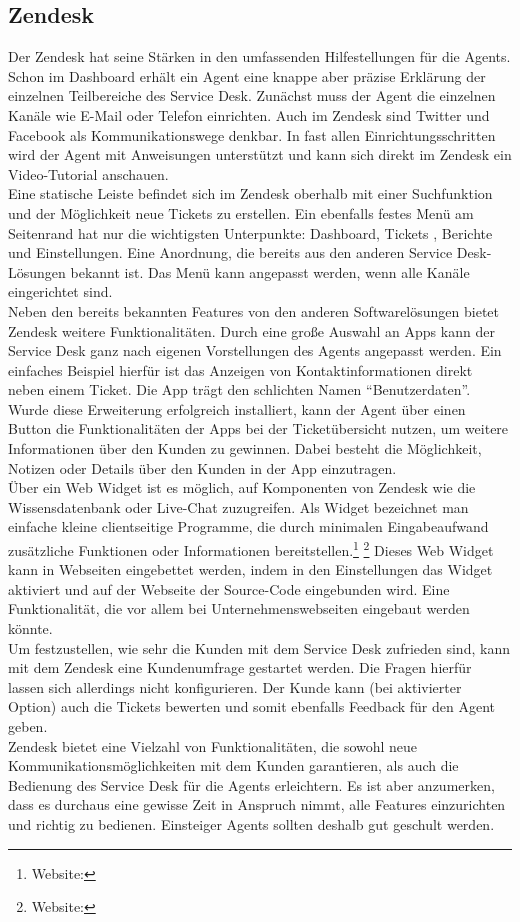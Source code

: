 \subsection{Zendesk}
\noindent 
Der Zendesk hat seine Stärken in den umfassenden Hilfestellungen für die Agents. Schon im Dashboard erhält ein Agent eine knappe aber präzise Erklärung der einzelnen Teilbereiche des Service Desk. Zunächst muss der Agent die einzelnen Kanäle wie E-Mail oder Telefon einrichten. Auch im Zendesk sind  Twitter und Facebook als Kommunikationswege denkbar. In fast allen Einrichtungsschritten wird der Agent mit Anweisungen unterstützt und kann sich direkt im Zendesk ein Video-Tutorial anschauen.\\
Eine statische Leiste befindet sich im Zendesk oberhalb mit einer Suchfunktion und der Möglichkeit neue Tickets zu erstellen. Ein ebenfalls festes Menü am Seitenrand hat nur die wichtigsten Unterpunkte: Dashboard, Tickets , Berichte und Einstellungen. Eine Anordnung, die bereits aus den anderen Service Desk-Lösungen bekannt ist. Das Menü kann angepasst werden, wenn alle Kanäle eingerichtet sind.\\
Neben den bereits bekannten Features von den anderen Softwarelösungen bietet Zendesk weitere Funktionalitäten. Durch eine große Auswahl an Apps kann der Service Desk ganz nach eigenen Vorstellungen des Agents angepasst werden. Ein einfaches Beispiel hierfür ist das Anzeigen von Kontaktinformationen direkt neben einem Ticket. Die App trägt den schlichten Namen \enquote{Benutzerdaten}. Wurde diese Erweiterung erfolgreich installiert, kann der Agent über einen Button die Funktionalitäten der Apps bei der Ticketübersicht nutzen,  um weitere Informationen über den Kunden zu gewinnen. Dabei besteht die Möglichkeit, Notizen oder Details über den Kunden in der App einzutragen.\\
Über ein Web Widget ist es möglich, auf Komponenten von Zendesk wie die Wissensdatenbank oder Live-Chat zuzugreifen. Als Widget bezeichnet man einfache kleine clientseitige Programme, die durch minimalen Eingabeaufwand zusätzliche Funktionen oder Informationen bereitstellen.\footnote{Website:\cite{Widget1}} \footnote{Website:\cite{Widget2}} Dieses Web Widget kann in Webseiten eingebettet werden, indem in den Einstellungen das Widget aktiviert und auf der Webseite der Source-Code eingebunden wird. Eine Funktionalität, die vor allem bei Unternehmenswebseiten  eingebaut werden könnte.\\
Um festzustellen, wie sehr die Kunden mit dem Service Desk zufrieden sind, kann mit dem Zendesk eine Kundenumfrage gestartet werden. Die Fragen hierfür lassen sich allerdings nicht konfigurieren. Der Kunde kann (bei aktivierter Option) auch die Tickets bewerten und somit ebenfalls Feedback für den Agent geben.\\
Zendesk bietet eine Vielzahl von Funktionalitäten, die sowohl neue Kommunikationsmöglichkeiten mit dem Kunden garantieren, als auch die Bedienung des Service Desk für die Agents erleichtern. Es ist aber anzumerken, dass es durchaus eine gewisse Zeit in Anspruch nimmt, alle Features einzurichten und richtig zu bedienen. Einsteiger Agents sollten deshalb gut geschult werden.\\

